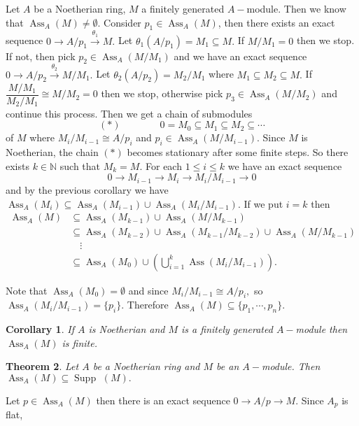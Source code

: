 \documentclass[11pt]{amsart}
\newtheorem{theorem}{Theorem}[section]
\newtheorem{corollary}[theorem]{Corollary}%
\newcommand{\NN}{\mathbb N}
\newcommand\isom{\mathrel{\stackon[-0.1ex]{\makebox*{\scalebox{1.08}{\AC}}{=\hfill\llap{=}}}{{\AC}}}}
\newcommand\nvisom{\rotatebox[origin=cc] {-90}{$ \isom $}}
\DeclareMathOperator{\ass}{\text{Ass}}
\DeclareMathOperator{\supp}{\text{Supp~}}
\begin{document}
Let $A$ be a Noetherian ring, $M$ a finitely generated $A-$module. Then we know that $\ass_A(M)\neq \emptyset.$ Consider $p_1\in\ass_A(M)$, then there exists an exact sequence $0\to A/p_1\xrightarrow{\theta_1} M.$ Let $\theta_1(A/p_1)=M_1\subseteq M.$ If $M/M_1=0$ then we stop. If not, then pick $p_2\in\ass_A(M/M_1)$ and we have an exact sequence $0\to A/p_2\xrightarrow{\theta_2} M/M_1.$ Let $\theta_2(A/p_2)=M_2/M_1$ where $M_1\subseteq M_2\subseteq M.$ If $\dfrac{M/M_1}{M_2/M_1}\cong M/M_2=0$ then we stop, otherwise pick $p_3\in \ass_A(M/M_2)$ and continue this process. Then we get a chain of submodules $$(*)\qquad\qquad 0=M_0\subseteq M_1\subseteq M_2\subseteq\cdots$$ of $M$ where $M_i/M_{i-1}\cong A/p_i$ and $p_i\in \ass_A(M/M_{i-1}).$ Since $M$ is Noetherian, the chain $(*)$ becomes stationary after some finite steps. So there exists $k\in{\NN}$ such that $M_k=M.$ For each $1\leq i\leq k$ we have an exact sequence $$0\to M_{i-1}\to M_i\to M_i/M_{i-1}\to 0$$ and by the previous corollary we have $\ass_A(M_i)\subseteq \ass_A(M_{i-1})\cup \ass_A(M_i/M_{i-1}).$ If we put $i=k$ then \begin{align*}
\ass_A(M)&\subseteq \ass_A(M_{k-1})\cup \ass_A(M/M_{k-1})\\
&\subseteq\ass_A(M_{k-2})\cup \ass_A(M_{k-1}/M_{k-2})\cup \ass_A(M/M_{k-1})\\
&\quad\vdots\\
&\subseteq \ass_A(M_0)\cup \left(\displaystyle\bigcup_{i=1}^k \ass(M_i/M_{i-1})\right).
\end{align*}

Note that $\ass_A(M_0)=\emptyset$ and since $M_i/M_{i-1}\cong A/p_i,$ so $\ass_A(M_i/M_{i-1})=\{p_i\}.$ Therefore $\ass_A(M)\subseteq \{p_1,\cdots,p_n\}.$

\begin{corollary}

If $A$ is Noetherian and $M$ is a finitely generated $A-$module then $\ass_A(M)$ is finite.

\end{corollary}

\begin{theorem}

Let $A$ be a Noetherian ring and $M$ be an $A-$module. Then $\ass_A(M)\subseteq \supp(M).$

\end{theorem}

\proof Let $p\in\ass_A(M)$ then there is an exact sequence $0\to A/p\to M$. Since $A_p$ is flat, \begin{center}


\end{center}
\end{document}
